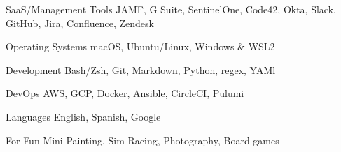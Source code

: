 

\begin{cvskills}


	\cvskill
	{SaaS/Management Tools} %
	{JAMF, G Suite, SentinelOne, Code42, Okta, Slack, GitHub, Jira, Confluence, Zendesk} %

	\cvskill
	{Operating Systems} %
	{macOS, Ubuntu/Linux, Windows \& WSL2} %

	\cvskill
	{Development} %
	{Bash/Zsh, Git, Markdown, Python, regex, YAMl} %

	\cvskill
	{DevOps} %
	{AWS, GCP, Docker, Ansible, CircleCI, Pulumi} %

	\cvskill
	{Languages} %
	{English, Spanish, Google} %

	\cvskill
	{For Fun}
	{Mini Painting, Sim Racing, Photography, Board games}

\end{cvskills}
